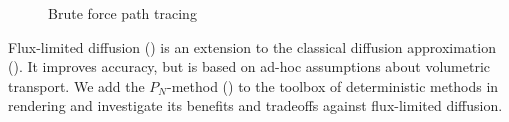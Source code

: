 {\begin{subfigure}{0.24\linewidth}
\vspace{-0.17in}
\caption{Brute force path tracing}
\label{fig:teaser_gt}
\end{subfigure}%
\vspace{-0.1in}
\icaption
{
Flux-limited diffusion () is an extension to the classical diffusion approximation (). It improves accuracy, but is based on ad-hoc assumptions about volumetric transport. We add the $P_N$-method () to the toolbox of deterministic methods in rendering and investigate its benefits and tradeoffs against flux-limited diffusion.
}
\label{fig:teaser}
}

\maketitle




